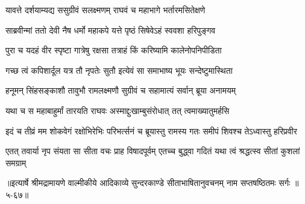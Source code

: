 \twolineshloka
{यावत्ते दर्शयाम्यद्य ससुग्रीवं सलक्ष्मणम्}
{राघवं च महाभागे भर्तारमसितेक्षणे} %

\twolineshloka
{साब्रवीन्मां ततो देवी नैष धर्मो महाकपे}
{यत्ते पृष्ठं सिषेवेऽहं स्ववशा हरिपुङ्गव} %

\twolineshloka
{पुरा च यदहं वीर स्पृष्टा गात्रेषु रक्षसा}
{तत्राहं किं करिष्यामि कालेनोपनिपीडिता} %

\twolineshloka
{गच्छ त्वं कपिशार्दूल यत्र तौ नृपतेः सुतौ}
{इत्येवं सा समाभाष्य भूयः सन्देष्टुमास्थिता} %

\twolineshloka
{हनूमन् सिंहसङ्काशौ तावुभौ रामलक्ष्मणौ}
{सुग्रीवं च सहामात्यं सर्वान् ब्रूया अनामयम्} %

\twolineshloka
{यथा च स महाबाहुर्मां तारयति राघवः}
{अस्माद्दुःखाम्बुसंरोधात् तत् त्वमाख्यातुमर्हसि} %

\twolineshloka
{इदं च तीव्रं मम शोकवेगं रक्षोभिरेभिः परिभर्त्सनं च}
{ब्रूयास्तु रामस्य गतः समीपं शिवश्च तेऽध्वास्तु हरिप्रवीर} %

\twolineshloka
{एतत् तवार्या नृप संयता सा सीता वचः प्राह विषादपूर्वम्}
{एतच्च बुद्ध्वा गदितं यथा त्वं श्रद्धत्स्व सीतां कुशलां समग्राम्} %


॥इत्यार्षे श्रीमद्रामायणे वाल्मीकीये आदिकाव्ये सुन्दरकाण्डे सीताभाषितानुवचनम् नाम सप्तषष्ठितमः सर्गः ॥५-६७॥
